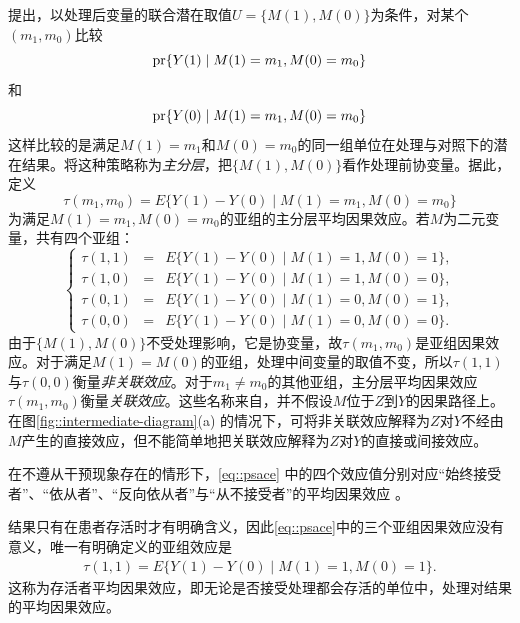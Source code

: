 \citet{frangakis2002principal}提出，以处理后变量的联合潜在取值$U = \{ M(1), M(0) \}$为条件，对某个$(m_1, m_0)$比较
$$
\textup{pr}\{  Y(1) \mid M(1) = m_1, M(0) = m_0 \}
$$
和
$$
\textup{pr}\{  Y(0) \mid M(1) = m_1, M(0) = m_0 \}
$$
这样比较的是满足$M(1) = m_1$和$ M(0) = m_0$的同一组单位在处理与对照下的潜在结果。\citet{frangakis2002principal}将这种策略称为{\it 主分层}，把$\{ M(1), M(0) \}$看作处理前协变量。据此，定义
$$
\tau(m_1, m_0) = E\{  Y(1) - Y(0) \mid M(1) = m_1, M(0) = m_0\}
$$
为满足$M(1) = m_1, M(0) = m_0$的亚组的主分层平均因果效应。若$M$为二元变量，共有四个亚组：
\begin{equation}
\label{eq::psace}
\left\{ \begin{array}{rcl}
\tau(1,1) &=& E\{  Y(1) - Y(0) \mid M(1) = 1, M(0) =1\} ,\\
\tau(1,0) &=&E\{  Y(1) - Y(0) \mid M(1) = 1, M(0) =0\},\\
\tau(0,1) &=&E\{  Y(1) - Y(0) \mid M(1) = 0, M(0) =1\},\\
\tau(0,0) &=&E\{  Y(1) - Y(0) \mid M(1) = 0, M(0) = 0 \}.
\end{array} 
\right.
\end{equation}
由于$\{ M(1), M(0) \}$不受处理影响，它是协变量，故$\tau(m_1, m_0) $是亚组因果效应。对于满足$M(1) = M(0)$的亚组，处理中间变量的取值不变，所以$\tau(1,1) $与$\tau(0,0)$衡量{\it 非关联效应}。对于$m_1 \neq m_0$的其他亚组，主分层平均因果效应$\tau(m_1, m_0) $衡量{\it 关联效应}。这些名称来自\citet{frangakis2002principal}，并不假设$M$位于$Z$到$Y$的因果路径上。在图\ref{fig::intermediate-diagram}(a) 的情况下，可将非关联效应解释为$Z$对$Y$不经由$M$产生的直接效应，但不能简单地把关联效应解释为$Z$对$Y$的直接或间接效应。 

 

\setcounter{example}{0}
\begin{example}[不遵从干预者]
在不遵从干预现象存在的情形下，\eqref{eq::psace} 中的四个效应值分别对应“始终接受者”、“依从者”、“反向依从者”与“从不接受者”的平均因果效应 \citep{imbens1994identification, angrist1996identification}。
\end{example}



\begin{example}[因死亡导致的数据截断]
结果只有在患者存活时才有明确含义，因此\eqref{eq::psace}中的三个亚组因果效应没有意义，唯一有明确定义的亚组效应是
\begin{eqnarray}
\label{eq::survivor}
\tau(1,1) = E\{  Y(1) - Y(0) \mid M(1) = 1, M(0) =1\} .
\end{eqnarray}
这称为存活者平均因果效应\citep{rubin2006causal}，即无论是否接受处理都会存活的单位中，处理对结果的平均因果效应。 
\end{example}



